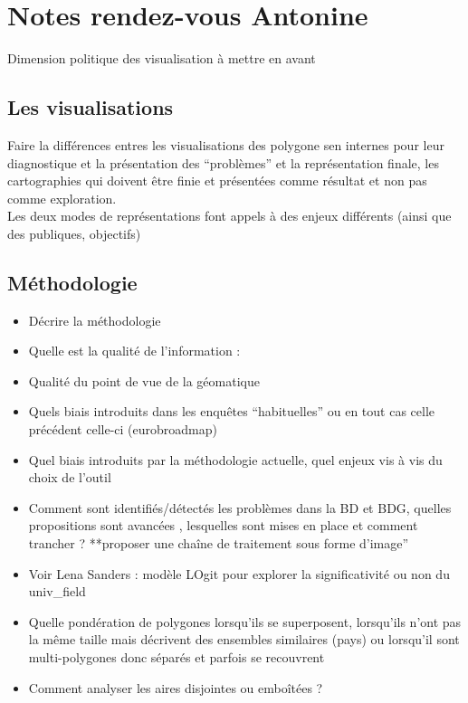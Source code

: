 \documentclass[
  12pt,
  a4paperpaper,
]{book}
\providecommand{\tightlist}{%
  \setlength{\itemsep}{0pt}\setlength{\parskip}{0pt}}\usepackage{longtable,booktabs,array}
\begin{document}

\hypertarget{notes-rendez-vous-antonine}{%
\chapter*{Notes rendez-vous Antonine}\label{notes-rendez-vous-antonine}}

Dimension politique des visualisation à mettre en avant

\hypertarget{les-visualisations}{%
\section*{Les visualisations}\label{les-visualisations}}

Faire la différences entres les visualisations des polygone sen internes
pour leur diagnostique et la présentation des ``problèmes'' et la
représentation finale, les cartographies qui doivent être finie et
présentées comme résultat et non pas comme exploration.\\
Les deux modes de représentations font appels à des enjeux différents
(ainsi que des publiques, objectifs)

\hypertarget{muxe9thodologie}{%
\section*{Méthodologie}\label{muxe9thodologie}}

\begin{itemize}
\tightlist
\item
  Décrire la méthodologie
\item
  Quelle est la qualité de l'information :
\item
  Qualité du point de vue de la géomatique
\item
  Quels biais introduits dans les enquêtes ``habituelles'' ou en tout
  cas celle précédent celle-ci (eurobroadmap)
\item
  Quel biais introduits par la méthodologie actuelle, quel enjeux vis à
  vis du choix de l'outil
\item
  Comment sont identifiés/détectés les problèmes dans la BD et BDG,
  quelles propositions sont avancées , lesquelles sont mises en place et
  comment trancher ? **proposer une chaîne de traitement sous forme
  d'image''
\item
  Voir Lena Sanders : modèle LOgit pour explorer la significativité ou
  non du univ\_field
\item
  Quelle pondération de polygones lorsqu'ils se superposent, lorsqu'ils
  n'ont pas la même taille mais décrivent des ensembles similaires
  (pays) ou lorsqu'il sont multi-polygones donc séparés et parfois se
  recouvrent
\item
  Comment analyser les aires disjointes ou emboîtées ?
\end{itemize}
\end{document}
